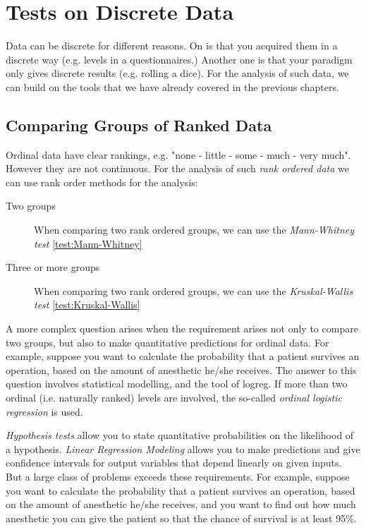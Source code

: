 \chapter{Tests on Discrete Data}

Data can be discrete for different reasons. On is that you acquired them in a discrete way (e.g. levels in a questionnaires.) Another one is that your paradigm only gives discrete results (e.g. rolling a dice). For the analysis of such data, we can build on the tools that we have already covered in the previous chapters.

\section{Comparing Groups of Ranked Data}

Ordinal data have clear rankings, e.g. "none - little - some - much - very much". However they are not continuous. For the analysis of such \emph{rank ordered data} we can use rank order methods for the analysis:

\begin{description}
  \item[Two groups] When comparing two rank ordered groups, we can use the \emph{Mann-Whitney test} \ref{test:Mann-Whitney}
  \item[Three or more groups]  When comparing two rank ordered groups, we can use the \emph{Kruskal-Wallis test} \ref{test:Kruskal-Wallis}

\end{description}

A more complex question arises when the requirement arises not only to compare two groups, but also to make quantitative predictions for ordinal data. For example, suppose you want to calculate the probability that a patient survives an operation, based on the amount of anesthetic he/she receives. The answer to this question involves statistical modelling, and the tool of \gls{logreg}. If more than two ordinal (i.e. naturally ranked) levels are involved, the so-called \emph{ordinal logistic regression} is used.

\emph{Hypothesis tests} allow you to state quantitative probabilities on the likelihood of a hypothesis. \emph{Linear Regression Modeling} allows you to make predictions and give confidence intervals for output variables that depend linearly on given inputs. But a large class of problems exceeds these requirements. For example, suppose you want to calculate the probability that a patient survives an operation, based on the amount of anesthetic he/she receives, and you want to find out how much anesthetic you can give the patient so that the chance of survival is at least 95\%.

